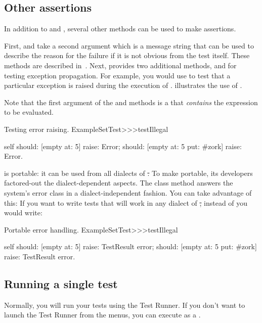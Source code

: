\documentclass[a4paper,10pt,twoside]{book}
\begin{document}
\subsection{Other assertions}
In addition to  and , several other methods can be used to make assertions.

First,  and  take a second argument which is a message string that can be used to describe the reason for the failure if it is not obvious from the test itself.
These methods are described in~.
Next, \sunit provides two additional methods,  and
 for testing exception propagation.
For example, you would use  to test that a particular exception is raised during the execution of .
 illustrates the use of \mbox{.}

Note that the first argument of the  and  methods is a  that \emph{contains} the expression to be evaluated.

\begin{method}[ESTtestIllegal]{Testing error raising.}
ExampleSetTest>>>testIllegal

	self
		should: [empty at: 5] raise: Error;
		should: [empty at: 5 put: #zork] raise: Error.
\end{method}

\sunit is portable: it can be used from all dialects of \st.
To make \sunit portable, its developers factored-out the dialect-dependent aspects.
The class method  answers the system's error class in a dialect-independent fashion.
You can take advantage of this:
If you want to write tests that will work in any dialect of \st, instead of  you would write:

\begin{method}[portabletestillegal]{Portable error handling.}
ExampleSetTest>>>testIllegal

	self
		should: [empty at: 5] raise: TestResult error;
		should: [empty at: 5 put: #zork] raise: TestResult error.
\end{method}


\subsection{Running a single test}
Normally, you will run your tests using the Test Runner.
If you don't want to launch the Test Runner from the menus, you can execute  as a .
\end{document}
